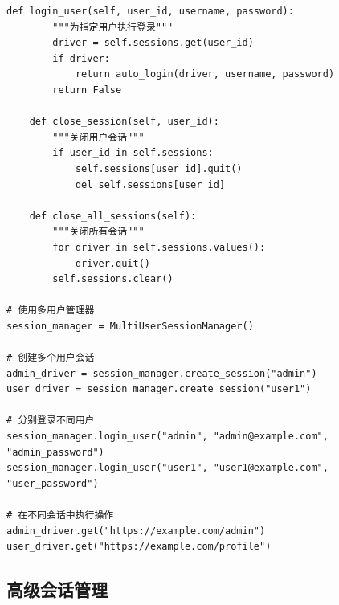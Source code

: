 \begin{lstlisting}[style=demostyle,numbers=none]
    def login_user(self, user_id, username, password):
        """为指定用户执行登录"""
        driver = self.sessions.get(user_id)
        if driver:
            return auto_login(driver, username, password)
        return False
    
    def close_session(self, user_id):
        """关闭用户会话"""
        if user_id in self.sessions:
            self.sessions[user_id].quit()
            del self.sessions[user_id]
    
    def close_all_sessions(self):
        """关闭所有会话"""
        for driver in self.sessions.values():
            driver.quit()
        self.sessions.clear()

# 使用多用户管理器
session_manager = MultiUserSessionManager()

# 创建多个用户会话
admin_driver = session_manager.create_session("admin")
user_driver = session_manager.create_session("user1")

# 分别登录不同用户
session_manager.login_user("admin", "admin@example.com", "admin_password")
session_manager.login_user("user1", "user1@example.com", "user_password")

# 在不同会话中执行操作
admin_driver.get("https://example.com/admin")
user_driver.get("https://example.com/profile")
\end{lstlisting}

\subsection{高级会话管理}


